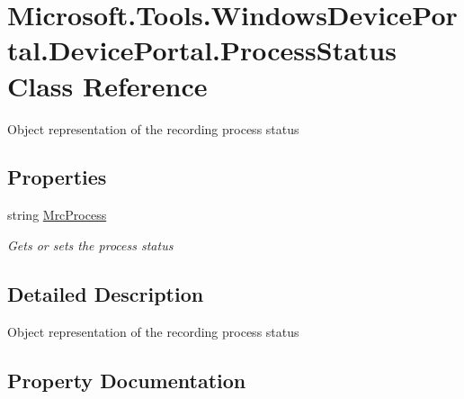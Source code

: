 \hypertarget{class_microsoft_1_1_tools_1_1_windows_device_portal_1_1_device_portal_1_1_process_status}{}\section{Microsoft.\+Tools.\+Windows\+Device\+Portal.\+Device\+Portal.\+Process\+Status Class Reference}
\label{class_microsoft_1_1_tools_1_1_windows_device_portal_1_1_device_portal_1_1_process_status}


Object representation of the recording process status  


\subsection*{Properties}
\begin{DoxyCompactItemize}
\item 
string \hyperlink{class_microsoft_1_1_tools_1_1_windows_device_portal_1_1_device_portal_1_1_process_status_a657860945aed2462fc2b1faa4696b6bb}{Mrc\+Process}
\begin{DoxyCompactList}\small\item\em Gets or sets the process status \end{DoxyCompactList}\end{DoxyCompactItemize}


\subsection{Detailed Description}
Object representation of the recording process status 



\subsection{Property Documentation}
